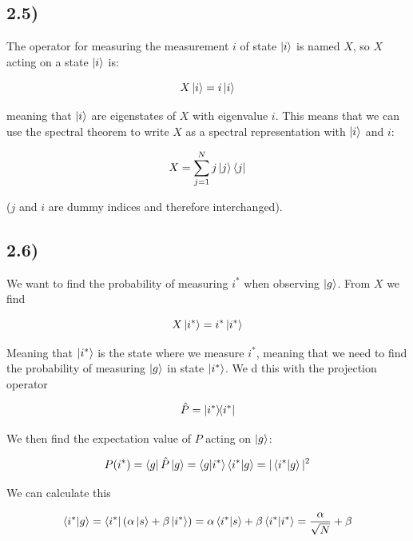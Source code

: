 \documentclass[a4paper,norsk, 10pt]{article}
\begin{document}
\subsection{2.5)}

The operator for measuring the measurement $i$ of state $\ket{i}$ is named $X$, so $X$ acting on a state $\ket{i}$ is:

\begin{equation}
X\ket{i} = i\ket{i}
\end{equation}

meaning that $\ket{i}$ are eigenstates of $X$ with eigenvalue $i$. This means that we can use the spectral theorem to write $X$ as a spectral representation with $\ket{i}$ and $i$:

\begin{equation}
X = \sum_{j=1}^N j\ket{j}\bra{j}
\end{equation}

($j$ and $i$ are dummy indices and therefore interchanged).

\subsection{2.6)}

We want to find the probability of measuring $i^*$ when observing $\ket{g}$. From $X$ we find

\begin{equation}
X\ket{i^*} = i^*\ket{i^*} 
\end{equation}

Meaning that $\ket{i^*}$ is the state where we measure $i^*$, meaning that we need to find the probability of measuring $\ket{g}$ in state $\ket{i^*}$. We d this with the projection operator

\begin{equation}
\hat{P} = \ketbra{i^*}{i^*}
\end{equation}

We then find the expectation value of $P$ acting on $\ket{g}$:

\begin{equation}
P(i^*) = \bra{g}\hat{P}\ket{g} = \bra{g}\ket{i^*}\bra{i^*}\ket{g} = |\braket{i^*}{g}|^2
\end{equation}

We can calculate this

\begin{equation}
\braket{i^*}{g} = \bra{i^*}(\alpha \ket{s} + \beta\ket{i^*}) = \alpha\braket{i^*}{s}+ \beta \braket{i^*}{i^*} = \frac{\alpha}{\sqrt{N}} + \beta
\end{equation}
\end{document}
